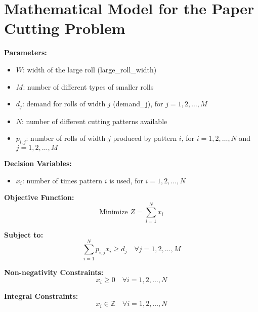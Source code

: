 \documentclass{article}
\begin{document}
\section*{Mathematical Model for the Paper Cutting Problem}

\textbf{Parameters:}
\begin{itemize}
    \item $W$: width of the large roll (large\_roll\_width)
    \item $M$: number of different types of smaller rolls
    \item $d_j$: demand for rolls of width $j$ (demand\_j), for $j = 1, 2, \ldots, M$
    \item $N$: number of different cutting patterns available
    \item $p_{i,j}$: number of rolls of width $j$ produced by pattern $i$, for $i = 1, 2, \ldots, N$ and $j = 1, 2, \ldots, M$
\end{itemize}

\textbf{Decision Variables:}
\begin{itemize}
    \item $x_i$: number of times pattern $i$ is used, for $i = 1, 2, \ldots, N$
\end{itemize}

\textbf{Objective Function:}
\begin{equation}
\text{Minimize } Z = \sum_{i=1}^{N} x_i
\end{equation}

\textbf{Subject to:}
\begin{equation}
\sum_{i=1}^{N} p_{i,j} x_i \geq d_j \quad \forall j = 1, 2, \ldots, M
\end{equation}

\textbf{Non-negativity Constraints:}
\begin{equation}
x_i \geq 0 \quad \forall i = 1, 2, \ldots, N
\end{equation}

\textbf{Integral Constraints:}
\begin{equation}
x_i \in \mathbb{Z} \quad \forall i = 1, 2, \ldots, N
\end{equation}
\end{document}
